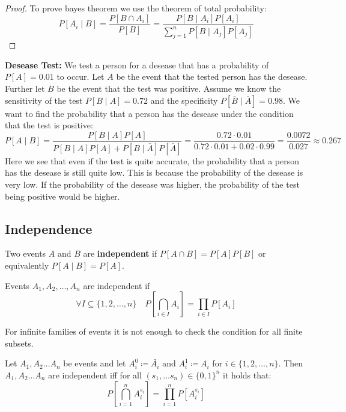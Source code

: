 \begin{proof}
    To prove bayes theorem we use the theorem of total probability:
    $$P[A_i \mid B] = \frac{P[B \cap A_i]}{P[B]} = \frac{P[B \mid A_i] P[A_i]}{\sum_{j=1}^n P[B \mid A_j] P[A_j]}$$
\end{proof}

    \begin{example}

\textbf{Desease Test: }We test a person for a desease that has a probability of $P[A] = 0.01$ to occur.
    Let $A$ be the event that the tested person has the desease. Further let $B$ be the event that the test
    was positive. Assume we know the sensitivity of the test $P[B \mid A] = 0.72$ and the specificity
    $P[\bar{B} \mid \bar{A}] = 0.98$. We want to find the probability that a person has the desease under
    the condition that the test is positive:
    $$P[A \mid B] = \frac{P[B \mid A] P[A]}{P[B \mid A] P[A] + P[B \mid
    \bar{A}] P[\bar{A}]} = \frac{0.72 \cdot 0.01}{0.72 \cdot 0.01 + 0.02 \cdot 0.99} = \frac{0.0072}{0.027}
    \approx 0.267$$
    Here we see that even if the test is quite accurate, the probability that a person has the desease
    is still quite low. This is because the probability of the desease is very low. If the probability of
    the desease was higher, the probability of the test being positive would be higher.
    
\end{example}

\subsection{Independence}

\begin{definition}
    Two events $A$ and $B$ are \textbf{independent} if $P[A \cap B] = P[A] P[B]$ or equivalently $P[A \mid B] = P[A]$.
\end{definition}

\begin{definition}
    Events $A_1, A_2, \dots, A_n$ are independent if
    $$\forall I \subseteq \{1, 2, \dots, n\}\quad P[\bigcap_{i \in I} A_i] = \prod_{i \in I} P[A_i]$$
\end{definition}

\begin{remark}
    For infinite families of events it is not enough to check the condition for all finite subsets.
\end{remark}

\begin{lemma}
    Let $A_1, A_2 \dots A_n$ be events and let $A_i^{0} \coloneqq \bar{A_i}$ and $A_i^{1} \coloneqq A_i$ for $i \in \{1, 2, \dots, n\}$.
    Then $A_1, A_2 \dots A_n$ are independent iff for all $(s_1, \dots s_n) \in \{0,1\}^{n}$ it holds that:
    $$P[\bigcap_{i=1}^n A_i^{s_i}] = \prod_{i=1}^n P[A_i^{s_i}]$$
\end{lemma}

